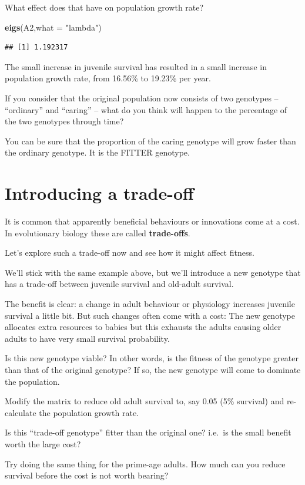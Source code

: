 \documentclass[
  a4paper]{book}
\newenvironment{Shaded}{\begin{snugshade}}{\end{snugshade}}
\newcommand{\AttributeTok}[1]{\textcolor[rgb]{0.13,0.29,0.53}{#1}}
\newcommand{\FunctionTok}[1]{\textcolor[rgb]{0.13,0.29,0.53}{\textbf{#1}}}
\newcommand{\NormalTok}[1]{#1}
\newcommand{\StringTok}[1]{\textcolor[rgb]{0.31,0.60,0.02}{#1}}
\begin{document}
What effect does that have on population growth rate?

\begin{Shaded}
\begin{Highlighting}[]
\FunctionTok{eigs}\NormalTok{(A2,}\AttributeTok{what =} \StringTok{"lambda"}\NormalTok{)}
\end{Highlighting}
\end{Shaded}

\begin{verbatim}
## [1] 1.192317
\end{verbatim}

The small increase in juvenile survival has resulted in a small increase in population growth rate, from 16.56\% to 19.23\% per year.

If you consider that the original population now consists of two genotypes -- ``ordinary'' and ``caring'' -- what do you think will happen to the percentage of the two genotypes through time?

You can be sure that the proportion of the caring genotype will grow faster than the ordinary genotype. It is the FITTER genotype.

\section{Introducing a trade-off}\label{introducing-a-trade-off}

It is common that apparently beneficial behaviours or innovations come at a cost. In evolutionary biology these are called \textbf{trade-offs}.

Let's explore such a trade-off now and see how it might affect fitness.

We'll stick with the same example above, but we'll introduce a new genotype that has a trade-off between juvenile survival and old-adult survival.

The benefit is clear: a change in adult behaviour or physiology increases juvenile survival a little bit.
But such changes often come with a cost: The new genotype allocates extra resources to babies but this exhausts the adults causing older adults to have very small survival probability.

Is this new genotype viable? In other words, is the fitness of the genotype greater than that of the original genotype? If so, the new genotype will come to dominate the population.

\begin{do-something}
Modify the matrix to reduce old adult survival to, say 0.05 (5\%
survival) and re-calculate the population growth rate.

Is this ``trade-off genotype'' fitter than the original one? i.e.~is the
small benefit worth the large cost?

Try doing the same thing for the prime-age adults. How much can you
reduce survival before the cost is not worth bearing?
\end{do-something}
\end{document}
